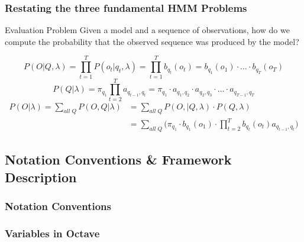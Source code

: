 \begin{frame}
  \frametitle{Restating the three fundamental HMM Problems}
  \begin{block}{Evaluation Problem}
    Given a model and a sequence of observations, how do we compute
    the probability that the \alert{observed sequence} was produced by
    the model?
  \end{block}
  \pause
  \begin{equation}
    P(O \vert Q, \lambda) = \displaystyle\prod_{t=1}^{T} P(o_t \vert
    q_t, \lambda)= \displaystyle\prod_{t=1}^{T} b_{q_t}(o_t) =
    b_{q_1}(o_1) \cdot \ldots \cdot b_{q_T}(o_T)
    \label{eq:pql}
  \end{equation}\pause
  \begin{equation}
    P(Q | \lambda) = \pi_{q_1}\displaystyle\prod_{t=2}^{T}
    a_{q_{t-1},q_t} = \pi_{q_1} \cdot a_{q_1,q_2} \cdot a_{q_2,q_3} \cdot \ldots \cdot
    a_{q_{T-1},q_T}\label{eq:pql2}
  \end{equation}\pause
  \begin{equation}
    \begin{split}
      P(O \vert \lambda) = \displaystyle\sum_{all\;Q} P(O, Q \vert
      \lambda) & = \displaystyle\sum_{all\;Q} P(O,\vert Q, \lambda)
      \cdot P(Q, \lambda) \\
      & = \displaystyle\sum_{all\;Q} \Big( \pi_{q_1} \cdot
      b_{q_1}(o_1) \cdot \displaystyle\prod_{t=2}^{T} b_{q_t}(o_t)
      a_{q_{t-1},q_t} \Big)
    \end{split}
    \label{eq:pql3}
  \end{equation}
\end{frame}


\subsection{Notation Conventions \& Framework Description}
\label{sec:octave}

\begin{frame}
  \frametitle{Notation Conventions}

  
\end{frame}


\begin{frame}
  \frametitle{Variables in Octave}

  
\end{frame}
